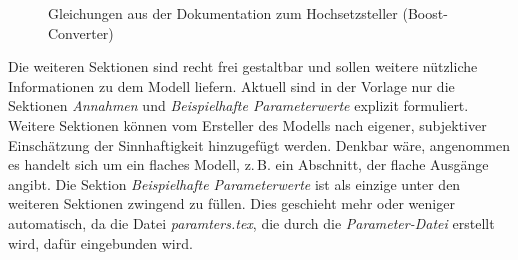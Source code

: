 \begin{figure}[H]
	\centering
	\caption[Beispiel der Gleichungen der Dokumentation]{Gleichungen aus der Dokumentation zum Hochsetzsteller (Boost-Converter)\protect\footnotemark}
	\label{fig:BspDok_ModelEquations}
\end{figure}
%
Die weiteren Sektionen sind recht frei gestaltbar und sollen weitere nützliche Informationen zu dem Modell liefern. Aktuell sind in der Vorlage nur die Sektionen \textit{Annahmen} und \textit{Beispielhafte Parameterwerte} explizit formuliert. Weitere Sektionen können vom Ersteller des Modells nach eigener, subjektiver Einschätzung der Sinnhaftigkeit hinzugefügt werden. Denkbar wäre, angenommen es handelt sich um ein flaches Modell, z.\,B. ein Abschnitt, der flache Ausgänge angibt. Die Sektion \textit{Beispielhafte Parameterwerte} ist als einzige unter den weiteren Sektionen zwingend zu füllen. Dies geschieht mehr oder weniger automatisch, da die Datei \textit{paramters.tex}, die durch die \textit{Parameter-Datei} erstellt wird, dafür eingebunden wird.

